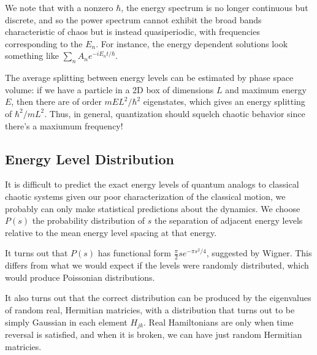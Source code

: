 \documentclass[12pt]{article}
\begin{document}
We note that with a nonzero $\hbar$, the energy spectrum is no longer continuous
but discrete, and so the power spectrum cannot exhibit the broad bands
characteristic of chaos but is instead quasiperiodic, with frequencies
corresponding to the $E_n$. For instance, the energy dependent solutions look
something like
$\sum\limits_{n}^{} A_ne^{-i E_n t/\hbar}$.

The average splitting between energy levels can be estimated by phase space
volume: if we have a particle in a 2D box of dimensions $L$ and maximum energy
$E$, then there are of order $mEL^2/\hbar^2$ eigenstates, which gives an energy
splitting of $\hbar^2/mL^2$. Thus, in general, quantization should squelch
chaotic behavior since there's a maxiumum frequency!

\subsection{Energy Level Distribution}

It is difficult to predict the exact energy levels of quantum analogs to
classical chaotic systems given our poor characterization of the classical
motion, we probably can only make statistical predictions about the dynamics. We
choose $P(s)$ the probability distribution of $s$ the separation of adjacent
energy levels relative to the mean energy level spacing at that energy.

It turns out that $P(s)$ has functional form $\frac{\pi}{2}se^{-\pi s^2/4}$,
suggested by Wigner. This differs from what we would expect if the levels were
randomly distributed, which would produce Poissonian distributions.

It also turns out that the correct distribution can be produced by the
eigenvalues of random real, Hermitian matricies, with a distribution that turns
out to be simply Gaussian in each element $H_{jk}$. Real Hamiltonians are only
when time reversal is satisfied, and when it is broken, we can have just random
Hermitian matricies.
\end{document}

